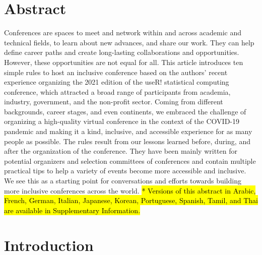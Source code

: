 \documentclass[10pt,letterpaper]{article}
\begin{document}
\section*{Abstract}

Conferences are spaces to meet and network within and across academic and technical fields, to learn about new advances, and share our work. They can help define career paths and create long-lasting collaborations and opportunities. 
However, these opportunities are not equal for all. 
This article introduces ten simple rules to host an inclusive conference based on the authors' recent experience organizing the 2021 edition of the useR! statistical computing conference, which attracted a broad range of participants from academia, industry, government, and the non-profit sector. 
Coming from different backgrounds, career stages, and even continents, we embraced the challenge of organizing a high-quality virtual conference in the context of the COVID-19 pandemic and making it a kind, inclusive, and accessible experience for as many people as possible.
The rules result from our lessons learned before, during, and after the organization of the conference. 
They have been mainly written for potential organizers and selection committees of conferences and contain multiple practical tips to help a variety of events become more accessible and inclusive. We see this as a starting point for conversations and efforts towards building more inclusive conferences across the world.
\hl{* Versions of this abstract in Arabic, French, German, Italian, Japanese, Korean, Portuguese, Spanish, Tamil, and Thai are available in Supplementary Information.}


\linenumbers

\section*{Introduction}
\end{document}
